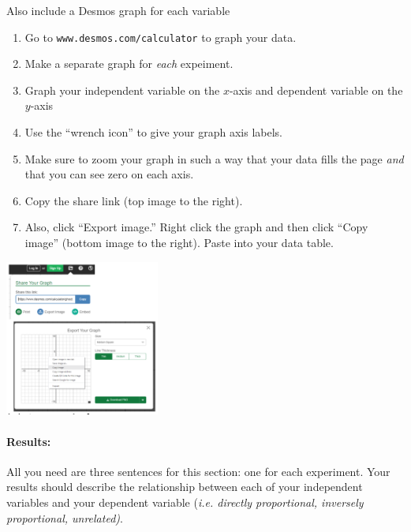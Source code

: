 \documentclass[10pt]{exam}
\begin{document}
  \noindent
  \begin{minipage}[b]{4.4in}
    \noindent
    Also include a Desmos graph for each variable
  
    \begin{enumerate}
      \item
        Go to \texttt{www.desmos.com/calculator} to graph your data.
      \item 
        Make a separate graph for \emph{each} expeiment.
      \item
        Graph your independent variable on the $x$-axis and dependent variable on the $y$-axis
      \item
        Use the ``wrench icon'' to give your graph axis labels.
      \item 
        Make sure to zoom your graph in such a way that your data fills the page \emph{and} that you can see zero on each axis.
      \item
        Copy the share link (top image to the right).
      \item
        Also, click ``Export image.'' Right click the graph and then click ``Copy image'' (bottom image to the right). Paste into your data
        table.
    \end{enumerate}
  \end{minipage}
%
  \begin{minipage}[t]{2in}
    \includegraphics[width=2in]{desmos.png}
  \end{minipage}

  


\paragraph{Results:} 
  All you need are three sentences for this section: one for each experiment.  Your results should describe the relationship between each of your independent variables and your dependent variable (\emph{i.e. directly proportional, inversely proportional, unrelated)}.
    
\end{document}
